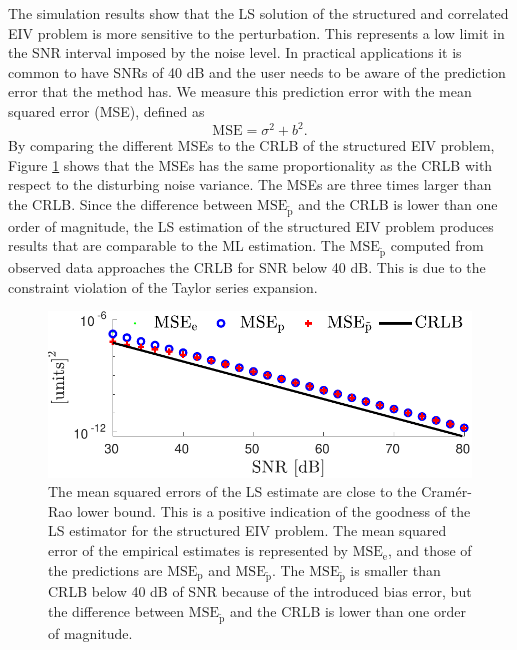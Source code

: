The simulation results show that the LS solution of the structured and correlated EIV problem is more sensitive to the perturbation.
This represents a low limit in the SNR interval imposed by the noise level.
In practical applications it is common to have SNRs of 40 dB and the user needs to be aware of the prediction error that the method has.
We measure this prediction error with the mean squared error (MSE), defined as
\begin{equation} \mathrm{MSE} = \sigma^2 + b^2. \end{equation}
 By comparing the different MSEs to the CRLB of the structured EIV problem,
Figure \ref{fig:MSE_CRLB} shows that the MSEs has the same proportionality as the CRLB with respect to the disturbing noise variance.
The MSEs are three times larger than the CRLB.
Since the difference between $\mathrm{MSE}_{\widetilde{\mathrm{p}}}$ and the CRLB is lower than one order of magnitude, 
the LS estimation of the structured EIV problem produces results that are comparable to the ML estimation.
The $\mathrm{MSE}_{\widetilde{\mathrm{p}}}$ computed from observed data approaches the CRLB for SNR below 40 dB.
This is due to the constraint violation of the Taylor series expansion.


\begin{figure}[!htpb]
  \centering
  \includegraphics[width=1\columnwidth]{./ChapterStatisticalAnalysis/fig/Fig_9.pdf}
  \caption{\label{fig:MSE_CRLB}
The mean squared errors of the LS estimate are close to the Cram\'er-Rao lower bound. This is a positive indication of the goodness of the LS estimator for the structured EIV problem. The mean squared error of the empirical estimates is represented by $\mathrm{MSE}_{\mathrm{e}}$, and those of the predictions are $\mathrm{MSE}_{\mathrm{p}}$ and $\mathrm{MSE}_{\widetilde{\mathrm{p}}}$. The $\mathrm{MSE}_{\widetilde{\mathrm{p}}}$ is smaller than CRLB below 40 dB of SNR because of the introduced bias error, but the difference between $\mathrm{MSE}_{\widetilde{\mathrm{p}}}$ and the CRLB is lower than one order of magnitude.}
\end{figure}


